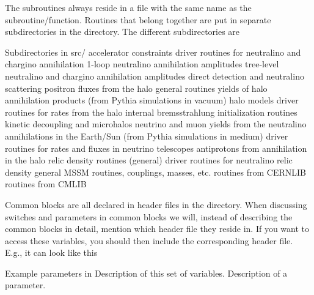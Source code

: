 The subroutines always reside in a file with the
same name as the subroutine/function. Routines that belong together
are put in separate subdirectories in the  directory. The different
subdirectories are
\begin{sub}{Subdirectories in src/}
       accelerator constraints
       driver routines for neutralino and chargino annihilation
     1-loop neutralino annihilation amplitudes
    tree-level neutralino and chargino annihilation amplitudes
       direct detection and neutralino scattering
       positron fluxes from the halo
       general routines
       yields of halo annihilation products (from Pythia
                 simulations in vacuum)
       halo models
       driver routines for rates from the halo
       internal bremsstrahlung
      initialization routines
       kinetic decoupling and microhalos
       neutrino and muon yields from the neutralino
                 annihilations in the Earth/Sun (from Pythia
                 simulations in medium)
       driver routines for rates and fluxes in neutrino telescopes
       antiprotons from annihilation in the halo
       relic density routines (general)
       driver routines for neutralino relic density
       general MSSM routines, couplings, masses, etc.
    routines from CERNLIB
   routines from CMLIB 
\end{sub}


Common blocks are all declared in header files in the 
directory. When discussing switches and parameters in common blocks we
will, instead of describing the common blocks in detail, 
mention which header file they reside in. If you want to access these
variables, you should then include the corresponding header
file. E.g., it can look like this
\begin{sub}{Example parameters in }
   Description of this set of variables.
   Description of a  parameter.
\end{sub}

